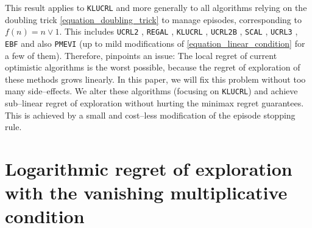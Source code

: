 \documentclass[preprint,cleveref,12pt]{colt2025}
\begin{document}
    This result applies to \texttt{KLUCRL} and more generally to all algorithms relying on the doubling trick \eqref{equation_doubling_trick} to manage episodes, corresponding to  $f(n) = n \vee 1$.
    This includes \texttt{UCRL2} \cite{auer_near_optimal_2009}, \texttt{REGAL} \cite{bartlett_regal_2009}, \texttt{KLUCRL} \cite{filippi_optimism_2010}, \texttt{UCRL2B} \cite{fruit_improved_2020}, \texttt{SCAL} \cite{fruit_efcient_2018}, \texttt{UCRL3} \cite{bourel_tightening_2020}, \texttt{EBF} \cite{zhang_regret_2019} and also \texttt{PMEVI} \cite{boone_achieving_2024} (up to mild modifications of \eqref{equation_linear_condition} for a few of them).
    Therefore,  pinpoints an issue: 
    The local regret of current optimistic algorithms is the worst possible, because the regret of exploration of these methods grows linearly. 
    In this paper, we will fix this problem without too many side--effects. 
    We alter these algorithms (focusing on \texttt{KLUCRL}) and achieve sub--linear regret of exploration without hurting the minimax regret guarantees.
    This is achieved by a small and cost--less modification of the episode stopping rule.

    \section{Logarithmic regret of exploration with the vanishing multiplicative condition}
    \label{section_vm_regret_guarantees}
\end{document}
